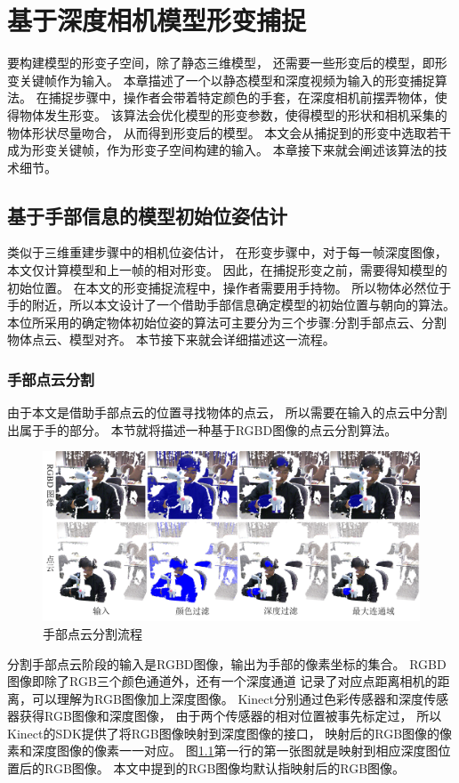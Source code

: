 \chapter{基于深度相机模型形变捕捉}
要构建模型的形变子空间，除了静态三维模型，
还需要一些形变后的模型，即形变关键帧作为输入。
本章描述了一个以静态模型和深度视频为输入的形变捕捉算法。
在捕捉步骤中，操作者会带着特定颜色的手套，在深度相机前摆弄物体，使得物体发生形变。
该算法会优化模型的形变参数，使得模型的形状和相机采集的物体形状尽量吻合，
从而得到形变后的模型。
本文会从捕捉到的形变中选取若干成为形变关键帧，作为形变子空间构建的输入。
本章接下来就会阐述该算法的技术细节。

\section{基于手部信息的模型初始位姿估计}

 类似于三维重建步骤中的相机位姿估计，
 在形变步骤中，对于每一帧深度图像，本文仅计算模型和上一帧的相对形变。
 因此，在捕捉形变之前，需要得知模型的初始位置。
 在本文的形变捕捉流程中，操作者需要用手持物。
 所以物体必然位于手的附近，所以本文设计了一个借助手部信息确定模型的初始位置与朝向的算法。
 本位所采用的确定物体初始位姿的算法可主要分为三个步骤:分割手部点云、分割物体点云、模型对齐。
 本节接下来就会详细描述这一流程。

\subsection{手部点云分割}
由于本文是借助手部点云的位置寻找物体的点云，
所以需要在输入的点云中分割出属于手的部分。
本节就将描述一种基于RGBD图像的点云分割算法。
\begin{figure}[h]
    \centering
    \includegraphics[width = \textwidth]{./Pictures/FindingHand.png}
    \caption{手部点云分割流程}
    \label{finding_hand}
\end{figure}
分割手部点云阶段的输入是RGBD图像，输出为手部的像素坐标的集合。
RGBD图像即除了RGB三个颜色通道外，还有一个深度通道
记录了对应点距离相机的距离，可以理解为RGB图像加上深度图像。
Kinect分别通过色彩传感器和深度传感器获得RGB图像和深度图像，
由于两个传感器的相对位置被事先标定过，
所以Kinect的SDK提供了将RGB图像映射到深度图像的接口，
映射后的RGB图像的像素和深度图像的像素一一对应。
图\ref{finding_hand}第一行的第一张图就是映射到相应深度图位置后的RGB图像。
本文中提到的RGB图像均默认指映射后的RGB图像。

